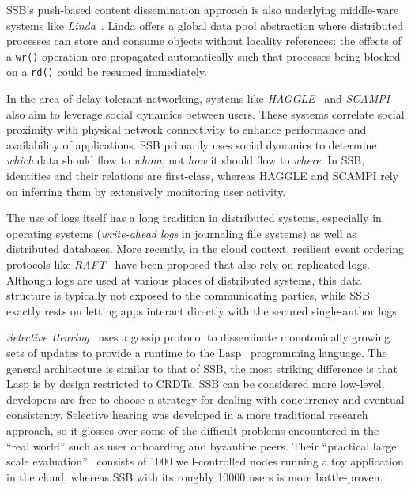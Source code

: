 \documentclass[9pt,sigconf]{acmart}
\begin{document}
SSB's push-based content dissemination approach is also
underlying middle-ware systems like
{\em Linda}~\cite{Gelernter:1985:GCL:2363.2433}. Linda offers a global data
pool abstraction where distributed processes can store and consume
objects without locality references: the effects of a {\tt wr()}
operation are propagated automatically such that processes being
blocked on a {\tt rd()} could be resumed immediately.

In the area of delay-tolerant networking, systems like {\em HAGGLE}~\cite{scott2006haggle} and {\em SCAMPI}~\cite{pitkanen2012scampi} also aim to leverage social dynamics between users. These systems correlate social proximity with physical network connectivity to enhance performance and availability of applications. SSB primarily uses social dynamics to determine {\em which} data should flow to {\em whom}, not {\em how} it should flow to {\em where}. In SSB, identities and their relations are first-class, whereas HAGGLE and SCAMPI rely on inferring them by extensively monitoring user activity.

The use of logs itself has a long tradition in distributed systems,
especially in operating systems (\textit{write-ahead logs} in journaling file
systems) as well as distributed databases. More recently, in the cloud
context, resilient event ordering protocols like
{\em RAFT}~\cite{DBLP:conf/usenix/OngaroO14} have been proposed that also
rely on replicated logs. Although logs are used at various places of
distributed systems, this data structure is typically not exposed to
the communicating parties, while SSB exactly rests on letting apps
interact directly with the secured single-author logs.

\textit{Selective Hearing}~\cite{meiklejohn2015selective} uses a gossip protocol to disseminate monotonically growing sets of updates to provide a runtime to the Lasp~\cite{meiklejohn2015lasp} programming language. The general architecture is similar to that of SSB, the most striking difference is that Lasp is by design restricted to CRDTs. SSB can be considered more low-level, developers are free to choose a strategy for dealing with concurrency and eventual consistency. Selective hearing was developed in a more traditional research approach, so it glosses over some of the difficult problems encountered in the ``real world'' such as user onboarding and byzantine peers. Their ``practical large scale evaluation''~\cite{meiklejohn2017lasp} consists of 1000 well-controlled nodes running a toy application in the cloud, whereas SSB with its roughly 10000 users is more battle-proven.
\end{document}
